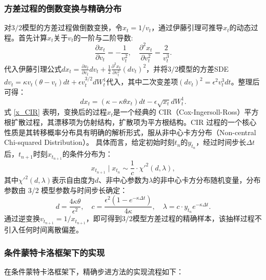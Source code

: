 \subsubsection{方差过程的倒数变换与精确分布}
对$3/2$模型的方差过程做倒数变换，令$x_t = 1/v_t$，通过伊藤引理可推导$x_t$的动态过程。首先计算$x_t$关于$v_t$的一阶与二阶导数:
\begin {equation}
  \frac {\partial x_t}{\partial v_t} = -\frac {1}{v_t^2}, \quad \frac {\partial^2 x_t}{\partial v_t^2} = \frac {2}{v_t^3}.
\end {equation}
代入伊藤引理公式$dx_t= \frac{\partial x_t}{\partial v_t} dv_t + \frac{1}{2} \frac{\partial^2 x_t}{\partial v_t^2} (dv_t)^2$，并将$3/2$模型的方差SDE $dv_t = \kappa v_t (\theta - v_t) dt + \epsilon v_t^{3/2} dW_t^1$代入，其中二次变差项$(dv_t)^2 = \epsilon^2 v_t^3 dt$。整理后可得：
\begin {equation}
  dx_t = \left ( \kappa - \kappa \theta x_t \right) dt - \epsilon \sqrt {x_t} dW_t^1.
  \label {x_CIR}
\end {equation}
式 \eqref {x_CIR} 表明，变换后的过程$x_t$是一个经典的 CIR（Cox-Ingersoll-Ross）平方根扩散过程，其漂移项为仿射结构，扩散项为平方根结构。CIR 过程的一个核心性质是其转移概率分布具有明确的解析形式，服从非中心卡方分布（Non-central Chi-squared Distribution）。
具体而言，给定初始时刻$t_n$的$y_{t_n}$，经过时间步长$\Delta t$后，$t_{n+1}$时刻$x_{t_{n+1}}$的条件分布为：
\begin {equation}
  x_{t_{n+1}} \mid x_{t_n} \sim \frac {1}{c} \cdot \chi'^2\left ( d, \lambda \right),
  \label {x_distribution}
\end {equation}
其中$\chi'^2 (d,\lambda)$表示自由度为$d$、非中心参数为$\lambda$的非中心卡方分布随机变量，分布参数由 3/2 模型参数与时间步长确定：
\begin {equation}
d = \frac {4 \kappa \theta}{\epsilon^2}, \quad c = \frac {\epsilon^2 \left ( 1 - e^{-\kappa \Delta t} \right)}{4 \kappa}, \quad \lambda = c \cdot y_{t_n} e^{-\kappa \Delta t}.
\end {equation}
通过逆变换$v_{t_{n+1}} = 1/x_{t_{n+1}}$，即可得到$3/2$模型方差过程的精确样本，该抽样过程不引入任何时间离散偏差。

\subsubsection{条件蒙特卡洛框架下的实现}
在条件蒙特卡洛框架下，精确步进方法的实现流程如下：

